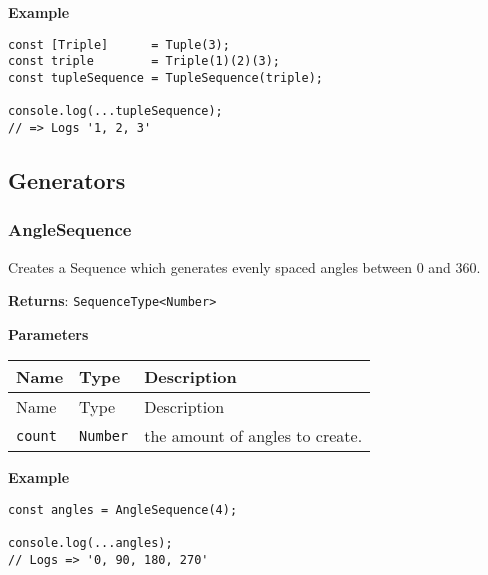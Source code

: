 \textbf{Example}

\begin{lstlisting}[label=d339d35f-afff-4109-a8f7-348b7f8d90b4]
const [Triple]      = Tuple(3);
const triple        = Triple(1)(2)(3);
const tupleSequence = TupleSequence(triple);
                                            
console.log(...tupleSequence);
// => Logs '1, 2, 3'
\end{lstlisting}

\hypertarget{ed041adb-4774-4c16-a585-05c2eaf8e235}{%
\subsection{Generators}\label{sub:appendix_generators}}


\hypertarget{68f6afbc-de45-4843-9b8c-ab5ca8806c10}{%
\subsubsection{AngleSequence}\label{68f6afbc-de45-4843-9b8c-ab5ca8806c10}}

Creates a Sequence which generates evenly spaced angles between 0 and
360.

\textbf{Returns}: \passthrough{\lstinline!SequenceType<Number>!}

\textbf{Parameters}

\begin{longtable}[]{
  >{\raggedright\arraybackslash}p{}
  >{\raggedright\arraybackslash}p{}
  >{\raggedright\arraybackslash}p{}@{}}

\toprule\noalign{}
Name & Type & Description \\
\midrule\noalign{}
\endfirsthead
\toprule\noalign{}
Name & Type & Description \\
\midrule\noalign{}
\endhead
\bottomrule\noalign{}
\endlastfoot
\passthrough{\lstinline!count!} & \passthrough{\lstinline!Number!} & the
amount of angles to create. \\
\end{longtable}

\textbf{Example}

\begin{lstlisting}[label=b94dc362-c081-4bfa-9d61-5c838e57a755]
const angles = AngleSequence(4);
                                
console.log(...angles);
// Logs => '0, 90, 180, 270'
\end{lstlisting}


